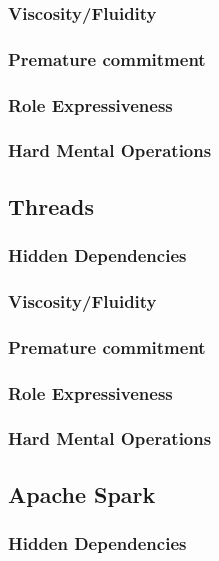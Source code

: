 \documentclass{sig-alternate}
\begin{document}
\subsubsection{Viscosity/Fluidity}

\subsubsection{Premature commitment}

\subsubsection{Role Expressiveness}

\subsubsection{Hard Mental Operations}

\subsection{Threads}
\subsubsection{Hidden Dependencies}

\subsubsection{Viscosity/Fluidity}

\subsubsection{Premature commitment}

\subsubsection{Role Expressiveness}

\subsubsection{Hard Mental Operations}

\subsection{Apache Spark}
\subsubsection{Hidden Dependencies}
\end{document}
